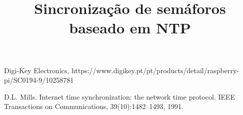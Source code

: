 \documentclass[conference]{IEEEtran}
\begin{document}
\title{Sincronização de semáforos baseado em NTP\\}

\author{
\and
{}

}

\maketitle

\begin{abstract}

\end{abstract}
















\begin{thebibliography}{00}
 Digi-Key Electronics, https://www.digikey.pt/pt/products/detail/raspberry-pi/SC0194-9/10258781

 D.L. Mills. Internet time synchronization: the network time protocol. IEEE Transactions on Communications, 39(10):1482–1493, 1991.



\end{thebibliography}
\end{document}
